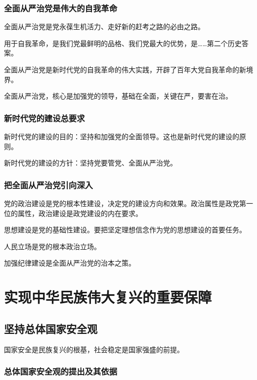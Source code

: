 \documentclass[12pt, a4paper, oneside]{ctexart}
\begin{document}
\subsubsection{全面从严治党是伟大的自我革命}

全面从严治党是党永葆生机活力、走好新的赶考之路的必由之路。

用于自我革命，是我们党最鲜明的品格、我们党最大的优势，是……第二个历史答案。

全面从严治党是新时代党的自我革命的伟大实践，开辟了百年大党自我革命的新境界。

全面从严治党，核心是加强党的领导，基础在全面，关键在严，要害在治。

\subsubsection{新时代党的建设总要求}

新时代党的建设的目的：坚持和加强党的全面领导。这也是新时代党的建设的原则。

新时代党的建设的方针：坚持党要管党、全面从严治党。

\subsubsection{把全面从严治党引向深入}

党的政治建设是党的根本性建设，决定党的建设方向和效果。政治属性是政党第一位的属性，政治建设是政党建设的内在要求。

思想建设是党的基础性建设。要把坚定理想信念作为党的思想建设的首要任务。

人民立场是党的根本政治立场。

加强纪律建设是全面从严治党的治本之策。

\section{实现中华民族伟大复兴的重要保障}

\subsection{坚持总体国家安全观}

国家安全是民族复兴的根基，社会稳定是国家强盛的前提。

\subsubsection{总体国家安全观的提出及其依据}
\end{document}
